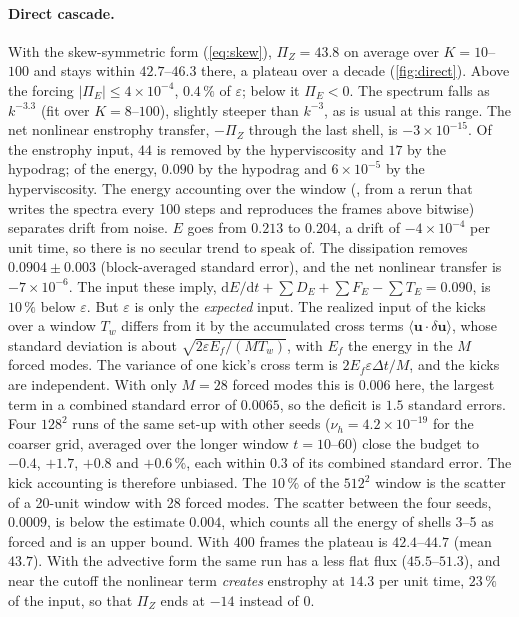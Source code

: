 \documentclass[11pt,a4paper]{article}
\newcommand{\code}[1]{\texttt{\detokenize{#1}}}
\begin{document}
\paragraph{Direct cascade.}  With the skew-symmetric form (\cref{eq:skew}), $\Pi_Z=43.8$ on average over $K=10$--$100$ and stays within $42.7$--$46.3$ there, a plateau over a decade (\cref{fig:direct}).  Above the forcing $|\Pi_E|\le4\times10^{-4}$, $0.4\,\%$ of $\varepsilon$; below it $\Pi_E<0$.  The spectrum falls as $k^{-3.3}$ (fit over $K=8$--$100$), slightly steeper than $k^{-3}$, as is usual at this range.  The net nonlinear enstrophy transfer, $-\Pi_Z$ through the last shell, is $-3\times10^{-15}$.  Of the enstrophy input, $44$ is removed by the hyperviscosity and $17$ by the hypodrag; of the energy, $0.090$ by the hypodrag and $6\times10^{-5}$ by the hyperviscosity.  The energy accounting over the window (\code{tools/cascade.py budget}, from a rerun that writes the spectra every 100 steps and reproduces the frames above bitwise) separates drift from noise.  $E$ goes from $0.213$ to $0.204$, a drift of $-4\times10^{-4}$ per unit time, so there is no secular trend to speak of.  The dissipation removes $0.0904\pm0.003$ (block-averaged standard error), and the net nonlinear transfer is $-7\times10^{-6}$.  The input these imply, $\mathrm{d}E/\mathrm{d}t+\sum D_E+\sum F_E-\sum T_E=0.090$, is $10\,\%$ below $\varepsilon$.  But $\varepsilon$ is only the \emph{expected} input.  The realized input of the kicks over a window $T_w$ differs from it by the accumulated cross terms $\langle\mathbf{u}\cdot\delta\mathbf{u}\rangle$, whose standard deviation is about $\sqrt{2\varepsilon E_f/(MT_w)}$, with $E_f$ the energy in the $M$ forced modes.  The variance of one kick's cross term is $2E_f\varepsilon\Delta t/M$, and the kicks are independent.  With only $M=28$ forced modes this is $0.006$ here, the largest term in a combined standard error of $0.0065$, so the deficit is $1.5$ standard errors.  Four $128^2$ runs of the same set-up with other seeds ($\nu_h=4.2\times10^{-19}$ for the coarser grid, averaged over the longer window $t=10$--$60$) close the budget to $-0.4$, $+1.7$, $+0.8$ and $+0.6\,\%$, each within $0.3$ of its combined standard error.  The kick accounting is therefore unbiased.  The $10\,\%$ of the $512^2$ window is the scatter of a 20-unit window with 28 forced modes.  The scatter between the four seeds, $0.0009$, is below the estimate $0.004$, which counts all the energy of shells 3--5 as forced and is an upper bound.  With 400 frames the plateau is $42.4$--$44.7$ (mean $43.7$).  With the advective form the same run has a less flat flux ($45.5$--$51.3$), and near the cutoff the nonlinear term \emph{creates} enstrophy at $14.3$ per unit time, $23\,\%$ of the input, so that $\Pi_Z$ ends at $-14$ instead of $0$.
\end{document}
